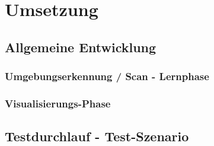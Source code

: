 

\chapter{Umsetzung}
\section{Allgemeine Entwicklung}
\subsection{Umgebungserkennung / Scan - Lernphase}
\subsection{Visualisierungs-Phase} 
\section{Testdurchlauf - Test-Szenario}